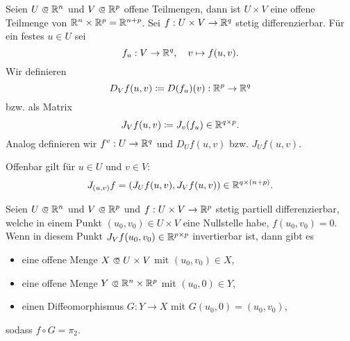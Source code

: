 \documentclass{cheat-sheet}
\begin{document}
\begin{nota}
  Seien $U \opn \R^n$ und $V \opn \R^p$ offene Teilmengen, dann ist $U \times V$ eine offene Teilmenge von $\mathbb{R}^n \times \mathbb{R}^p = \mathbb{R}^{n + p}$. Sei $f : U \times V \to \mathbb{R}^q$ stetig differenzierbar. Für ein festes $u \in U$ sei
  \[ f_u : V \to \mathbb{R}^q,\quad v \mapsto f(u, v). \]
  Wir definieren
  \[ D_V f(u, v) \coloneqq D(f_u)(v) : \mathbb{R}^p \to \mathbb{R}^q \]
  bzw. als Matrix
  \[ J_V f(u, v) \coloneqq J_v(f_u) \in \mathbb{R}^{q \times p}. \]
  Analog definieren wir $f^v : U \to \mathbb{R}^q$ und $D_U f(u, v)$ bzw. $J_U f(u, v)$.
\end{nota}

\begin{bem}
  Offenbar gilt für $u \in U$ und $v \in V$:
  \[ J_{(u, v)} f = \left( J_U f(u, v), J_V f(u, v) \right) \in \mathbb{R}^{q \times (n + p)}. \]
\end{bem}

\begin{satz}
  Seien $U \opn \R^n$ und $V \opn \R^p$ und $f : U \times V \to \mathbb{R}^p$ stetig partiell differenzierbar, welche in einem Punkt $(u_0, v_0) \in U \times V$ eine Nullstelle habe, \dh{} $f(u_0, v_0) = 0$. Wenn in diesem Punkt $J_V f(u_0, v_0) \in \mathbb{R}^{p \times p}$ invertierbar ist, dann gibt es
  \begin{itemize}
    \item eine offene Menge $X \opn U \times V$ mit $(u_0, v_0) \in X$,
    \item eine offene Menge $Y \opn \R^n \times \R^p$ mit $(u_0, 0) \in Y$,
    \item einen Diffeomorphismus $G : Y \to X$ mit $G(u_0, 0) = (u_0, v_0)$,
  \end{itemize}
  sodass $f \circ G = \pi_2.$
\end{satz}
\end{document}

